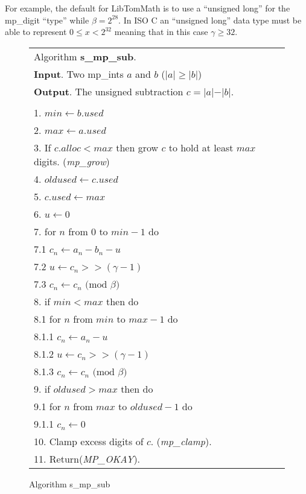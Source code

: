 \documentclass[b5paper]{book}
\begin{document}
For example, the default for LibTomMath is to use a ``unsigned long'' for the mp\_digit ``type'' while $\beta = 2^{28}$.  In ISO C an ``unsigned long''
data type must be able to represent $0 \le x < 2^{32}$ meaning that in this case $\gamma \ge 32$.

\newpage\begin{figure}[!here]
\begin{center}
\begin{small}
\begin{tabular}{l}
\hline Algorithm \textbf{s\_mp\_sub}. \\
\textbf{Input}.   Two mp\_ints $a$ and $b$ ($\vert a \vert \ge \vert b \vert$) \\
\textbf{Output}.  The unsigned subtraction $c = \vert a \vert - \vert b \vert$. \\
\hline \\
1.  $min \leftarrow b.used$ \\
2.  $max \leftarrow a.used$ \\
3.  If $c.alloc < max$ then grow $c$ to hold at least $max$ digits.  (\textit{mp\_grow}) \\
4.  $oldused \leftarrow c.used$ \\ 
5.  $c.used \leftarrow max$ \\
6.  $u \leftarrow 0$ \\
7.  for $n$ from $0$ to $min - 1$ do \\
\hspace{3mm}7.1  $c_n \leftarrow a_n - b_n - u$ \\
\hspace{3mm}7.2  $u   \leftarrow c_n >> (\gamma - 1)$ \\
\hspace{3mm}7.3  $c_n \leftarrow c_n \mbox{ (mod }\beta\mbox{)}$ \\
8.  if $min < max$ then do \\
\hspace{3mm}8.1  for $n$ from $min$ to $max - 1$ do \\
\hspace{6mm}8.1.1  $c_n \leftarrow a_n - u$ \\
\hspace{6mm}8.1.2  $u   \leftarrow c_n >> (\gamma - 1)$ \\
\hspace{6mm}8.1.3  $c_n \leftarrow c_n \mbox{ (mod }\beta\mbox{)}$ \\
9. if $oldused > max$ then do \\
\hspace{3mm}9.1  for $n$ from $max$ to $oldused - 1$ do \\
\hspace{6mm}9.1.1  $c_n \leftarrow 0$ \\
10. Clamp excess digits of $c$.  (\textit{mp\_clamp}). \\
11. Return(\textit{MP\_OKAY}). \\
\hline
\end{tabular}
\end{small}
\end{center}
\caption{Algorithm s\_mp\_sub}
\end{figure}
\end{document}
